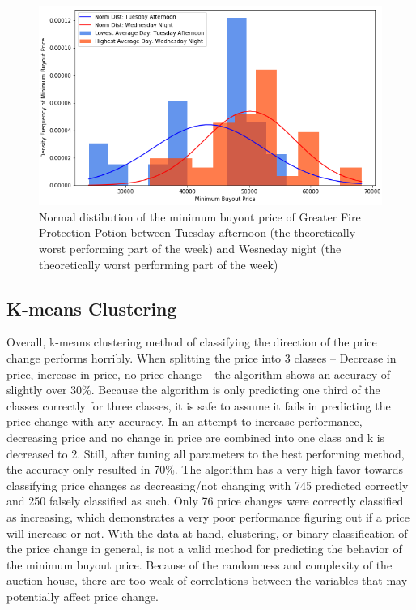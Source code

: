 \documentclass[sigconf]{acmart}
\begin{document}
\begin{figure}[h]
\centering
\includegraphics[width=\linewidth]{bestworst_hist}
\caption{Normal distibution of the minimum buyout price of Greater Fire Protection Potion between Tuesday afternoon (the theoretically worst performing part of the week) and Wesneday night (the theoretically worst performing part of the week)}
\end{figure}


\subsection{K-means Clustering}
Overall, k-means clustering method of classifying the direction of the price change performs horribly. When splitting the price into 3 classes – Decrease in price, increase in price, no price change – the algorithm shows an accuracy of slightly over 30\%. Because the algorithm is only predicting one third of the classes correctly for three classes, it is safe to assume it fails in predicting the price change with any accuracy. In an attempt to increase performance, decreasing price and no change in price are combined into one class and k is decreased to 2. Still, after tuning all parameters to the best performing method, the accuracy only resulted in 70\%. The algorithm has a very high favor towards classifying price changes as decreasing/not changing with 745 predicted correctly and 250 falsely classified as such. Only 76 price changes were correctly classified as increasing, which demonstrates a very poor performance figuring out if a price will increase or not. With the data at-hand, clustering, or binary classification of the price change in general, is not a valid method for predicting the behavior of the minimum buyout price. Because of the randomness and complexity of the auction house, there are too weak of correlations between the variables that may potentially affect price change.
\end{document}
